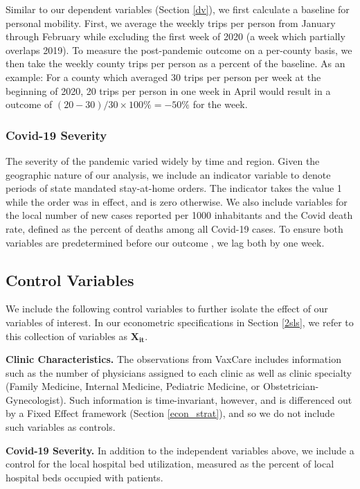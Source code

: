  Similar to our dependent variables (Section \ref{dv}), we first calculate a baseline for personal mobility. First, we average the weekly trips per person from January through February while excluding the first week of 2020 (a week which partially overlaps 2019). To measure the post-pandemic outcome on a per-county basis, we then take the weekly county trips per person as a percent of the baseline. As an example: For a county which averaged 30 trips per person per week at the beginning of 2020, 20 trips per person in one week in April would result in a outcome of $(20-30)/30\times100\% = -50\%$ for the week.
 
 \subsubsection{Covid-19 Severity} 
 The severity of the pandemic varied widely by time and region. Given the geographic nature of our analysis, we include an indicator variable to denote periods of state mandated stay-at-home orders. The indicator takes the value 1 while the order was in effect, and is zero otherwise. We also include variables for the local number of new cases reported per 1000 inhabitants and the Covid death rate, defined as the percent of deaths among all Covid-19 cases. To ensure both variables are predetermined before our outcome \citep{Angrist2009}, we lag both by one week.
 
\subsection{Control Variables} \label{controls}
 We include the following control variables to further isolate the effect of our variables of interest. In our econometric specifications in Section \ref{2sls}, we refer to this collection of variables as $\boldsymbol{X_{it}}$. 
 
 \noindent \textbf{Clinic Characteristics.} The observations from VaxCare includes information such as the number of physicians assigned to each clinic as well as clinic specialty (Family Medicine, Internal Medicine, Pediatric Medicine, or Obstetrician-Gynecologist). Such information is time-invariant, however, and is differenced out by a Fixed Effect framework (Section \ref{econ_strat}), and so we do not include such variables as controls.
 
 \noindent \textbf{Covid-19 Severity.} In addition to the independent variables above, we include a control for the local hospital bed utilization, measured as the percent of local hospital beds occupied with patients. 
 
